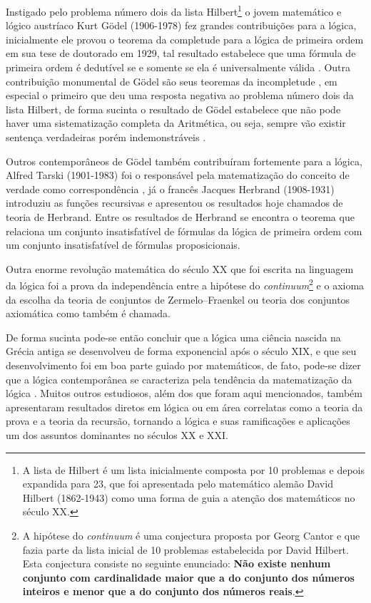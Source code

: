 Instigado pelo problema número dois da lista Hilbert\footnote{A lista de Hilbert é um lista inicialmente composta por 10 problemas e depois expandida para 23, que foi apresentada pelo matemático alemão David Hilbert (1862-1943) como uma forma de guia a atenção dos matemáticos no século XX.} o jovem matemático e lógico austríaco Kurt Gödel (1906-1978) fez grandes contribuições para a lógica, inicialmente ele provou o teorema da completude para a lógica de primeira ordem em sua tese de doutorado em 1929, tal resultado estabelece que uma fórmula de primeira ordem é dedutível se e somente se ela é universalmente válida \cite{benja-Logica}. Outra contribuição monumental de Gödel são seus teoremas da incompletude \cite{godel1931}, em especial o primeiro que deu uma resposta negativa ao problema número dois da lista Hilbert, de forma sucinta o resultado de Gödel estabelece que não pode haver uma sistematização completa da Aritmética, ou seja, sempre vão existir sentença verdadeiras porém indemonstráveis \cite{abe2002-logica, magnus2020}.

Outros contemporâneos de Gödel também contribuíram fortemente para a lógica, Alfred Tarski (1901-1983) foi o responsável pela matematização do conceito de verdade como correspondência \cite{abe2002-logica, tarski1983}, já o francês Jacques Herbrand (1908-1931) introduziu as funções recursivas e apresentou os resultados hoje chamados de teoria de Herbrand. Entre os resultados de Herbrand se encontra o teorema que relaciona um conjunto insatisfatível de fórmulas da lógica de primeira ordem com um conjunto insatisfatível de fórmulas proposicionais.

Outra enorme revolução matemática do século XX que foi escrita na linguagem da lógica foi a prova da independência entre a hipótese do \textit{continuum}\footnote{A hipótese do \textit{continuum} é uma conjectura proposta por Georg Cantor e que fazia parte da lista inicial de 10 problemas estabelecida por David Hilbert. Esta conjectura consiste no seguinte enunciado: \textbf{Não existe nenhum conjunto com cardinalidade maior que a do conjunto dos números inteiros e menor que a do conjunto dos números reais}.} e o axioma da escolha da teoria de conjuntos de Zermelo–Fraenkel ou teoria dos conjuntos axiomática como também é chamada.

De forma sucinta pode-se então concluir que a lógica uma ciência nascida na Grécia antiga se desenvolveu de forma exponencial após o século XIX, e que seu desenvolvimento foi em boa parte guiado por matemáticos, de fato, pode-se dizer que a lógica contemporânea se caracteriza pela tendência da matematização da lógica \cite{barreto}. Muitos outros estudiosos, além dos que foram aqui mencionados, também apresentaram resultados diretos em lógica ou em área correlatas como a teoria da prova e a teoria da recursão, tornando a lógica e suas ramificações e aplicações um dos assuntos dominantes no séculos XX e XXI. 

